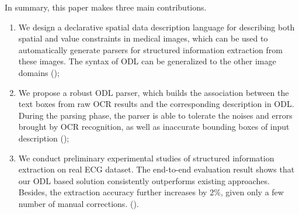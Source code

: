 In summary, this paper makes three main contributions.
\begin{enumerate}
\item We design a declarative spatial data description language
for describing both spatial and value constraints in medical images,
which can be used to automatically generate parsers for
structured information extraction from these images.
The syntax of ODL can be generalized to
the other image domains ();
\item We propose a robust ODL parser,
which builds the association between the text boxes from raw OCR results
and the corresponding description in ODL.
During the parsing phase, the parser is able to tolerate
the noises and errors brought by OCR recognition,
as well as inaccurate bounding boxes of input description ();
\item We conduct preliminary experimental studies of
structured information extraction on real ECG dataset.
The end-to-end evaluation result shows that our ODL based solution
consistently outperforms existing approaches.
Besides, the extraction accuracy further increases by 2\%,
given only a few number of manual corrections.
().
\end{enumerate}
